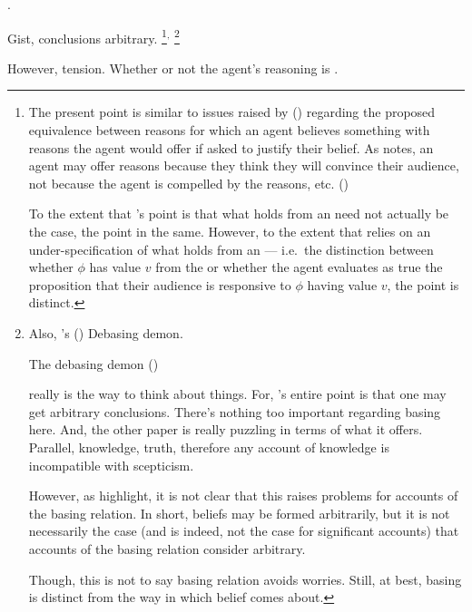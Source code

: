 \begin{note}
  .

  Gist, conclusions arbitrary.%
  \footnote{
    The present point is similar to issues raised by \citeauthor{Harman:1973ww} (\citeyear{Harman:1973ww}) regarding the proposed equivalence between reasons for which an agent believes something with reasons the agent would offer if asked to justify their belief.
  As \citeauthor{Harman:1973ww} notes, an agent may offer reasons because they think they will convince their audience, not because the agent is compelled by the reasons, etc.
  (\citeyear[Ch.2]{Harman:1973ww})

  To the extent that \citeauthor{Harman:1973ww}'s point is that what holds from an \agpe{} need not actually be the case, the point in the same.
  However, to the extent that \citeauthor{Harman:1973ww} relies on an under-specification of what holds from an \agpe{} --- i.e.\ the distinction between whether \(\phi\) has value \(v\) from the \agpe{} or whether the agent evaluates as true the proposition that their audience is responsive to \(\phi\) having value \(v\), the point is distinct.
}\(^{,}\)%
  \footnote{
    Also, \citeauthor{Schaffer:2010vq}'s (\citeyear{Schaffer:2010vq}) Debasing demon.

    The debasing demon  (\citeyear[231]{Schaffer:2010vq})

    \citeauthor{Schaffer:2010vq} really is the way to think about things.
    For, \citeauthor{Schaffer:2010vq}'s entire point is that one may get arbitrary conclusions.
    There's nothing too important regarding basing here.
    And, the other paper is really puzzling in terms of what it offers.
    Parallel, knowledge, truth, therefore any account of knowledge is incompatible with scepticism.

    However, as \citeauthor{Bondy:2018tk} highlight, it is not clear that this raises problems for accounts of the basing relation.
    In short, beliefs may be formed arbitrarily, but it is not necessarily the case (and is indeed, not the case for significant accounts) that accounts of the basing relation consider arbitrary.

    Though, this is not to say basing relation avoids worries.
    Still, at best, basing is distinct from the way in which belief comes about.
  }

  However, tension.
  Whether or not the agent's reasoning is \tR{}.
\end{note}


